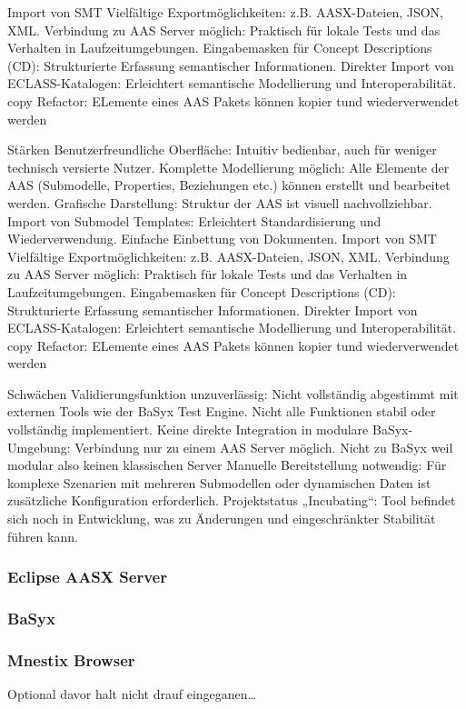 Import von SMT
Vielfältige Exportmöglichkeiten: z.B. AASX-Dateien, JSON, XML.
Verbindung zu AAS Server möglich: Praktisch für lokale Tests und das Verhalten in Laufzeitumgebungen.
Eingabemasken für Concept Descriptions (CD): Strukturierte Erfassung semantischer Informationen.
Direkter Import von ECLASS-Katalogen: Erleichtert semantische Modellierung und Interoperabilität.
copy Refactor: ELemente eines AAS Pakets können kopier tund wiederverwendet werden





Stärken
Benutzerfreundliche Oberfläche: Intuitiv bedienbar, auch für weniger technisch versierte Nutzer.
Komplette Modellierung möglich: Alle Elemente der AAS (Submodelle, Properties, Beziehungen etc.) können erstellt und bearbeitet werden.
Grafische Darstellung: Struktur der AAS ist visuell nachvollziehbar.
Import von Submodel Templates: Erleichtert Standardisierung und Wiederverwendung.
Einfache Einbettung von Dokumenten.
Import von SMT
Vielfältige Exportmöglichkeiten: z.B. AASX-Dateien, JSON, XML.
Verbindung zu AAS Server möglich: Praktisch für lokale Tests und das Verhalten in Laufzeitumgebungen.
Eingabemasken für Concept Descriptions (CD): Strukturierte Erfassung semantischer Informationen.
Direkter Import von ECLASS-Katalogen: Erleichtert semantische Modellierung und Interoperabilität.
copy Refactor: ELemente eines AAS Pakets können kopier tund wiederverwendet werden


Schwächen
Validierungsfunktion unzuverlässig: Nicht vollständig abgestimmt mit externen Tools wie der BaSyx Test Engine.
Nicht alle Funktionen stabil oder vollständig implementiert.
Keine direkte Integration in modulare BaSyx-Umgebung: Verbindung nur zu einem AAS Server möglich. Nicht zu BaSyx weil modular also keinen klassischen Server
Manuelle Bereitstellung notwendig: Für komplexe Szenarien mit mehreren Submodellen oder dynamischen Daten ist zusätzliche Konfiguration erforderlich.
Projektstatus „Incubating“: Tool befindet sich noch in Entwicklung, was zu Änderungen und eingeschränkter Stabilität führen kann.

\subsubsection{Eclipse AASX Server}
\subsubsection{BaSyx}
\subsubsection{Mnestix Browser}
Optional davor halt nicht drauf eingeganen\dots